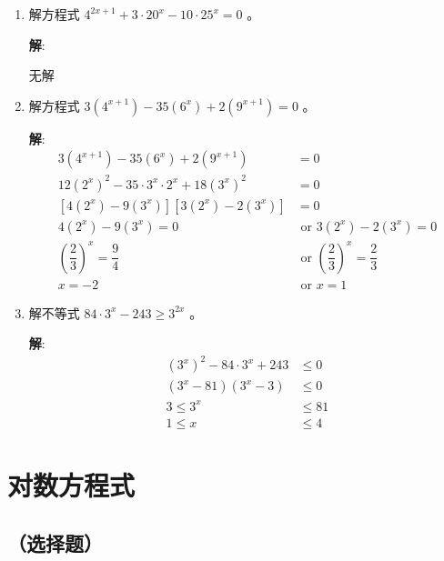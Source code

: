 \documentclass{report}
\newcommand{\sol}{\vspace{0.2cm}\textbf{解}:}
\begin{document}
\begin{multicols*}{2}
\begin{enumerate}[leftmargin=*]
        \item 解方程式 $4^{2 x+1}+3 \cdot 20^x-10 \cdot 25^x=0$ 。

              \sol{}

              无解

        \item 解方程式 $3\left(4^{x+1}\right)-35\left(6^x\right)+2\left(9^{x+1}\right)=0$ 。

              \sol{}
              \begin{align*}
                  3(4^{x+1}) - 35(6^x) + 2(9^{x+1})                      & = 0                                                    \\
                  12(2^{x})^2 - 35 \cdot 3^{x} \cdot 2^{x} + 18(3^{x})^2 & = 0                                                    \\
                  [4(2^x) - 9(3^{x})][3(2^x) - 2(3^{x})]                 & = 0                                                    \\
                  4(2^x) - 9(3^{x})= 0                                   & \text{ or } 3(2^x) - 2(3^{x}) = 0                      \\
                  \left(\dfrac{2}{3}\right)^x = \dfrac{9}{4}             & \text{ or } \left(\dfrac{2}{3}\right)^x = \dfrac{2}{3} \\
                  x  = -2                                                & \text{ or } x = 1
              \end{align*}

        \item 解不等式 $84 \cdot 3^x-243 \geq 3^{2 x}$ 。

              \sol{}
              \begin{align*}
                  (3^x)^2 - 84 \cdot 3^x + 243 & \leq 0  \\
                  (3^x - 81)(3^x - 3)          & \leq 0  \\
                  3 \leq 3^x                   & \leq 81 \\
                  1 \leq x                     & \leq 4
              \end{align*}
    \end{enumerate}

    \section{对数方程式}

    \subsection*{（选择题）}


\end{multicols*}
\end{document}
